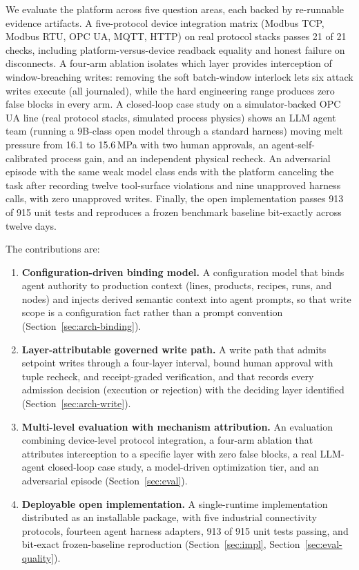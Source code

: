 We evaluate the platform across five question areas, each backed by
re-runnable evidence artifacts. A five-protocol device integration matrix
(Modbus TCP, Modbus RTU, OPC UA, MQTT, HTTP) on real protocol stacks passes
21 of 21 checks, including platform-versus-device readback equality and
honest failure on disconnects. A four-arm ablation isolates which layer
provides interception of window-breaching writes: removing the soft
batch-window interlock lets six attack writes execute (all journaled), while
the hard engineering range produces zero false blocks in every arm. A
closed-loop case study on a simulator-backed OPC UA line (real protocol
stacks, simulated process physics) shows an LLM agent team (running a
9B-class open model through a standard harness) moving melt pressure
from 16.1 to 15.6\,MPa with two human approvals, an
agent-self-calibrated process gain, and an independent physical recheck. An
adversarial episode with the same weak model class ends with the platform
canceling the task after recording twelve tool-surface violations and nine
unapproved harness calls, with zero unapproved writes. Finally, the open
implementation passes 913 of 915 unit tests and reproduces a frozen
benchmark baseline bit-exactly across twelve days.

The contributions are:
\begin{enumerate}
\item \textbf{Configuration-driven binding model.} A configuration model
that binds agent authority to production context (lines, products,
recipes, runs, and nodes) and injects derived semantic context into agent
prompts, so that write scope is a configuration fact rather than a prompt
convention (Section~\ref{sec:arch-binding}).
\item \textbf{Layer-attributable governed write path.} A write path that
admits setpoint writes through a four-layer interval, bound human approval
with tuple recheck, and receipt-graded verification, and that records every
admission decision (execution or rejection) with the deciding layer
identified (Section~\ref{sec:arch-write}).
\item \textbf{Multi-level evaluation with mechanism attribution.} An
evaluation combining device-level protocol integration, a four-arm ablation
that attributes interception to a specific layer with zero false blocks, a
real LLM-agent closed-loop case study, a model-driven optimization tier, and
an adversarial episode (Section~\ref{sec:eval}).
\item \textbf{Deployable open implementation.} A single-runtime
implementation distributed as an installable package, with five industrial
connectivity protocols, fourteen agent harness adapters, 913 of 915 unit
tests passing, and bit-exact frozen-baseline reproduction
(Section~\ref{sec:impl}, Section~\ref{sec:eval-quality}).
\end{enumerate}

